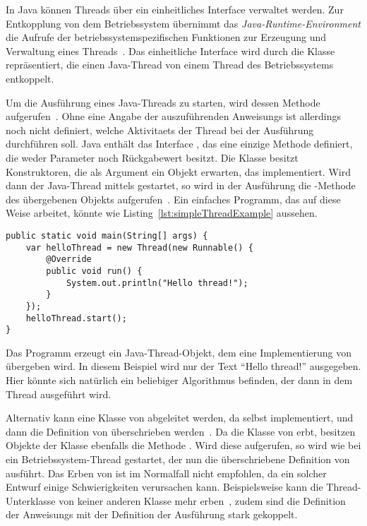 In Java können Threads über ein einheitliches Interface verwaltet werden. Zur Entkopplung von dem Betriebssystem übernimmt das \emph{Java-Runtime-Environment} die Aufrufe der betriebssystemspezifischen Funktionen zur Erzeugung und Verwaltung eines Threads~\cite[S.~3]{Friesen2015}. Das einheitliche Interface wird durch die Klasse  repräsentiert, die einen Java-Thread von einem Thread des  Betriebssystems entkoppelt. 

Um die Ausführung eines Java-Threads zu starten, wird dessen Methode  aufgerufen~\cite[S.~8]{Friesen2015}. Ohne eine Angabe der auszuführenden \glspl{Anweisung} ist allerdings noch nicht definiert, welche \glspl{Aktivitaet} der Thread bei der Ausführung durchführen soll. Java enthält das Interface , das eine einzige Methode  definiert, die weder Parameter noch Rückgabewert besitzt. Die Klasse  besitzt Konstruktoren, die als Argument ein Objekt erwarten, das  implementiert. Wird dann der Java-Thread mittels  gestartet, so wird in der Ausführung die -Methode des übergebenen Objekts aufgerufen~\cite[S.~3]{Friesen2015}. Ein einfaches \gls{Programm}, das auf diese Weise arbeitet, könnte wie Listing~\ref{lst:simpleThreadExample} aussehen.
\begin{lstlisting}[caption={[Beispiel für ein Java-\glsentrylong{Programm}, das einen mit einem \class{Runnable}-Objekt einen Thread erzeugt und dann startet.]Beispiel für ein Java-\gls{Programm} das einen mit einem \class{Runnable}-Objekt einen Thread erzeugt und dann startet.},label={lst:simpleThreadExample},float={htbp}]
public static void main(String[] args) {
	var helloThread = new Thread(new Runnable() {
		@Override
		public void run() {
			System.out.println("Hello thread!");
		}
	});
	helloThread.start();
}
\end{lstlisting}
Das \gls{Programm} erzeugt ein Java-Thread-Objekt, dem eine Implementierung von  übergeben wird. In diesem Beispiel wird nur der Text \enquote{Hello thread!} ausgegeben. Hier könnte sich natürlich ein beliebiger Algorithmus befinden, der dann in dem Thread ausgeführt wird.

Alternativ kann eine Klasse von  abgeleitet werden, da  selbst  implementiert, und dann die Definition von  überschrieben werden~\cite[S.~335]{Rauber2006}. Da die Klasse von  erbt, besitzen Objekte der Klasse ebenfalls die Methode . Wird diese aufgerufen, so wird wie bei  ein Betriebssystem-Thread gestartet, der nun die überschriebene Definition von  ausführt. Das Erben von  ist im Normalfall nicht empfohlen, da ein solcher Entwurf einige Schwierigkeiten verursachen kann. Beispielsweise kann die Thread-Unterklasse von keiner anderen Klasse mehr erben~\cite[S.~335]{Rauber2006}, zudem sind die Definition der \glspl{Anweisung} mit der Definition der Ausführung stark gekoppelt.

